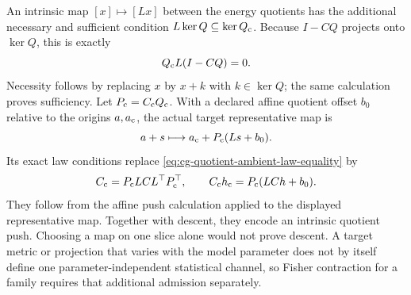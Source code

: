 An intrinsic map \([x]\mapsto[Lx]\) between the energy
quotients has the additional necessary and sufficient
condition \(L\ker Q\subseteq\ker Q_{\rm c}\).
Because \(I-CQ\) projects onto \(\ker Q\), this is
exactly
\begin{equation}
Q_{\rm c}L(I-CQ)=0.
\label{eq:cg-quotient-map-descent}
\end{equation}
Necessity follows by replacing \(x\) by \(x+k\) with
\(k\in\ker Q\); the same calculation proves
sufficiency. Let \(P_{\rm c}=C_{\rm c}Q_{\rm c}\).
With a declared affine quotient offset \(b_0\) relative
to the origins \(a,a_{\rm c}\), the actual target
representative map is
\[
a+s\longmapsto
a_{\rm c}+P_{\rm c}(Ls+b_0).
\]
Its exact law conditions replace
\eqref{eq:cg-quotient-ambient-law-equality} by
\begin{equation}
C_{\rm c}=P_{\rm c}LCL^\top P_{\rm c}^\top,\qquad
C_{\rm c}h_{\rm c}=P_{\rm c}(LCh+b_0).
\label{eq:cg-quotient-intrinsic-law-equality}
\end{equation}
They follow from the affine push calculation applied
to the displayed representative map. Together with
descent, they encode an intrinsic quotient push.
Choosing a map on one slice alone would not prove
descent. A target metric or projection that varies
with the model parameter does not by itself define
one parameter-independent statistical channel, so
Fisher contraction for a family requires that
additional admission separately.

